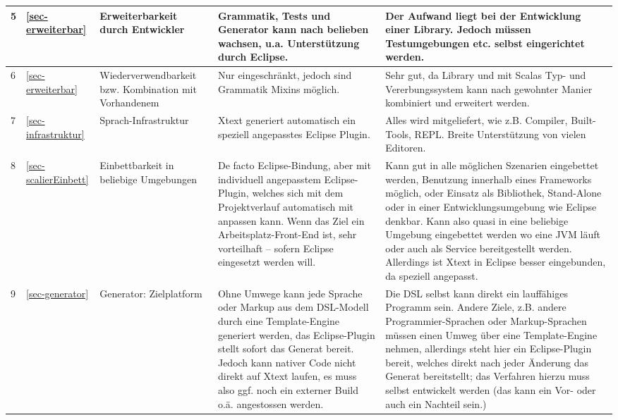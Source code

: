 \begin{landscape}
\begin{longtable}{|p{0.5cm}|p{0.8cm}|p{4.3cm}|p{6.3cm}|p{6.3cm}|}
  5
  & \ref{sec-erweiterbar}
  & Erweiterbarkeit durch Entwickler
  & Grammatik, Tests und Generator kann nach belieben wachsen, u.a.
    Unterstützung durch Eclipse.
  & Der Aufwand liegt bei der Entwicklung einer Library. Jedoch müssen
    Testumgebungen etc. selbst eingerichtet werden.
  \\\hline

  6
  & \ref{sec-erweiterbar}
  & Wiederverwendbarkeit bzw. Kombination mit Vorhandenem
  & Nur eingeschränkt, jedoch sind Grammatik Mixins möglich.
  & Sehr gut, da Library und mit Scalas Typ- und Vererbungssystem kann nach
    gewohnter Manier kombiniert und erweitert werden.
  \\\hline

  7
  & \ref{sec-infrastruktur}
  & Sprach-Infrastruktur
  & Xtext generiert automatisch ein speziell angepasstes Eclipse Plugin.
  & Alles wird mitgeliefert, wie z.B. Compiler, Built-Tools, REPL.
    Breite Unterstützung von vielen Editoren.
  \\\hline

  8
  & \ref{sec-scalierEinbett}
  & Einbettbarkeit in beliebige Umgebungen
  & De facto Eclipse-Bindung, aber mit individuell angepasstem Eclipse-Plugin,
    welches sich mit dem Projektverlauf automatisch mit anpassen kann.
    Wenn das Ziel ein Arbeitsplatz-Front-End ist, sehr vorteilhaft -- sofern
    Eclipse eingesetzt werden will.
  & Kann gut in alle möglichen Szenarien eingebettet werden, Benutzung
    innerhalb eines Frameworks möglich, oder Einsatz als Bibliothek,
    Stand-Alone oder in einer Entwicklungsumgebung wie Eclipse denkbar.
    Kann also quasi in eine beliebige Umgebung eingebettet werden
    wo eine JVM läuft oder auch als Service bereitgestellt werden.
    Allerdings ist Xtext in Eclipse besser eingebunden, da speziell angepasst.
  \\\hline

  9
  & \ref{sec-generator}
  & Generator: Zielplatform
  & Ohne Umwege kann jede Sprache oder Markup aus dem DSL-Modell durch eine
    Template-Engine generiert werden, das Eclipse-Plugin stellt sofort das
    Generat bereit. Jedoch kann nativer Code nicht direkt auf Xtext laufen,
    es muss also ggf. noch ein externer Build o.ä. angestossen werden.
  & Die DSL selbst kann direkt ein lauffähiges Programm sein. Andere Ziele,
    z.B. andere Programmier-Sprachen oder Markup-Sprachen müssen einen Umweg
    über eine Template-Engine nehmen, allerdings steht hier ein Eclipse-Plugin
    bereit, welches direkt nach jeder Änderung das Generat bereitstellt; das
    Verfahren hierzu muss selbst entwickelt werden (das kann ein Vor- oder
    auch ein Nachteil sein.)
  \\\hline


\end{longtable}
\end{landscape}
